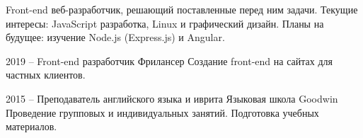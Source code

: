 \documentclass[9pt]{developercv} %
\begin{document}
\vspace{0.5cm}

\begin{minipage}[t]{0.4\textwidth} %
	\vspace{-\baselineskip} %
Front-end веб-разработчик, решающий поставленные перед ним задачи. Текущие интересы: JavaScript разработка, Linux и графический дизайн. Планы на будущее: изучение Node.js (Express.js) и Angular.	
\end{minipage}
\hfill %
\begin{minipage}[t]{0.5\textwidth} %
	\vspace{-\baselineskip} %
	\begin{barchart}{5.5}
	\end{barchart}
\end{minipage}


\begin{entrylist}
  \entry
      {2019 --  }
      {Front-end разработчик}
      {Фрилансер}
      {Создание front-end на сайтах для частных клиентов.}
\end{entrylist}

\begin{entrylist}
  \entry
      {2015 --  }
      {Преподаватель английского языка и иврита}
      {Языковая школа Goodwin}
      {Проведение групповых и индивидуальных занятий. Подготовка учебных материалов.}
\end{entrylist}

\end{document}
